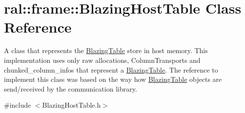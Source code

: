 \hypertarget{classral_1_1frame_1_1BlazingHostTable}{}\section{ral\+:\+:frame\+:\+:Blazing\+Host\+Table Class Reference}
\label{classral_1_1frame_1_1BlazingHostTable}


A class that represents the \hyperlink{classral_1_1frame_1_1BlazingTable}{Blazing\+Table} store in host memory. This implementation uses only raw allocations, Column\+Transports and chunked\+\_\+column\+\_\+infos that represent a \hyperlink{classral_1_1frame_1_1BlazingTable}{Blazing\+Table}. The reference to implement this class was based on the way how \hyperlink{classral_1_1frame_1_1BlazingTable}{Blazing\+Table} objects are send/received by the communication library.  




{\ttfamily \#include $<$Blazing\+Host\+Table.\+h$>$}

